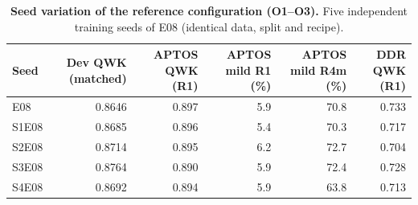 \begin{table}[h]
\caption{\textbf{Seed variation of the reference configuration (O1--O3).} Five independent training seeds of E08 (identical data, split and recipe).}\label{tab:s6}
\centering\scriptsize
\begin{tabular}{@{}lrrrrr@{}}
\toprule
Seed & Dev QWK (matched) & APTOS QWK (R1) & APTOS mild R1 (\%) & APTOS mild R4m (\%) & DDR QWK (R1) \\
\midrule
E08 & 0.8646 & 0.897 & 5.9 & 70.8 & 0.733 \\
S1E08 & 0.8685 & 0.896 & 5.4 & 70.3 & 0.717 \\
S2E08 & 0.8714 & 0.895 & 6.2 & 72.7 & 0.704 \\
S3E08 & 0.8764 & 0.890 & 5.9 & 72.4 & 0.728 \\
S4E08 & 0.8692 & 0.894 & 5.9 & 63.8 & 0.713 \\
\bottomrule
\end{tabular}
\end{table}
